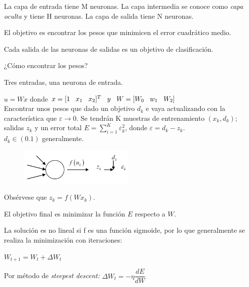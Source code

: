 La capa de entrada tiene M neuronas.
La capa intermedia se conoce como \textit{capa oculta} y tiene H neuronas.
La capa de salida tiene N neuronas.

El objetivo es encontrar los pesos que minimicen el error cuadrático medio.


Cada salida de las neuronas de salidas es un objetivo de clasificación.

\begin{ejemplo}
	
¿Cómo encontrar los pesos?

Tres entradas, una neurona de entrada.

$u=Wx$ donde $x = [1 \hspace{0.3cm} x_1 \hspace{0.3cm}  x_2]^T \hspace{0.3cm} y \hspace{0.3cm} W= [W_0 \hspace{0.3cm} w_1 \hspace{0.3cm} W_2]$
\\

Encontrar unos pesos que dado un objetivo $d_k$ e vaya actualizando con la característica que $\varepsilon \rightarrow 0$. Se
tendrán K muestras de entrenamiento $(x_k,d_k)$; salidas $z_k$ y un error total $E= \sum_{i=1}^{K}  \varepsilon_k^2$, donde $\varepsilon= d_k - z_k$.
\\

$d_k \in (0.1)$ generalmente. 

\end{ejemplo}


\begin{figure}[h!]
	\centering
	\includegraphics[width=0.5\textwidth]{images/img77.png}
	\label{figura77}
\end{figure}

Obsérvese que $z_k = f(Wx_k)$.

El objetivo final es minimizar la función $E$ respecto a $W$. 

La solución es no lineal si f es una función sigmoide, por lo que generalmente se realiza la minimización con
iteraciones:

$ W_{t+1} = W_t + \Delta W_t
$

Por método de \textit{steepest descent:}
$\Delta W_t= -\eta \dfrac{dE}{dW}
$

